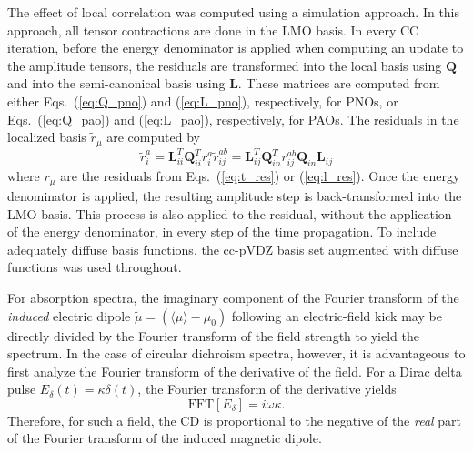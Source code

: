 The effect of local correlation was computed using a simulation approach\cite{Hampel1996}.
In this approach, all tensor contractions are done in the LMO basis. In every 
CC iteration, before the 
energy denominator is applied when computing an update to the amplitude tensors, the residuals
are transformed into the local basis using $\textbf{Q}$ and into the semi-canonical
basis using $\textbf{L}$. These matrices are computed from either Eqs.~(\ref{eq:Q_pno}) 
and (\ref{eq:L_pno}), respectively, for PNOs, or Eqs.~(\ref{eq:Q_pao}) and (\ref{eq:L_pao}),
respectively, for PAOs. The residuals in the localized basis $\tilde{r}_\mu$ are 
computed by
\begin{subequations} \label{eq:rotate}
\begin{equation} \label{eq:rotate_r1}
    \tilde{r}_i^a = \textbf{L}_{ii}^T\textbf{Q}_{ii}^Tr_i^a
\end{equation}
\begin{equation} \label{eq:rotate_r2}
    \tilde{r}_{ij}^{ab} = \textbf{L}_{ij}^T\textbf{Q}_{in}^Tr_{ij}^{ab}\textbf{Q}_{in}\textbf{L}_{ij}
\end{equation}
\end{subequations}
where $r_\mu$ are the residuals from Eqs.~(\ref{eq:t_res}) or (\ref{eq:l_res}). 
Once the energy denominator is applied, the resulting amplitude step is back-transformed
into the LMO basis. This process is also applied to the residual, without the
application of the energy denominator, in every step of the time propagation.
To include 
adequately diffuse basis functions, the cc-pVDZ basis
set augmented with diffuse functions\cite{Dunning1989,Woon1994} was used throughout.  

For absorption spectra, 
the imaginary component of the Fourier transform of the \textit{induced} electric dipole 
$\tilde{\mu} = (\langle\mu\rangle - \mu_0)$ following an electric-field kick 
may be directly divided by the Fourier transform of the field strength to yield the spectrum. 
In the case of circular dichroism spectra, however, it is advantageous to first 
analyze the Fourier transform of the derivative of the field. 
For a Dirac delta pulse $E_\delta(t) = \kappa\delta(t)$, 
the Fourier transform of the derivative yields
\begin{equation}
    \textrm{FFT}[E_\delta] = i\omega\kappa.
\end{equation}
Therefore, for such a field, the CD is proportional to the negative of the 
\textit{real} part of the Fourier 
transform of the induced magnetic dipole. 


